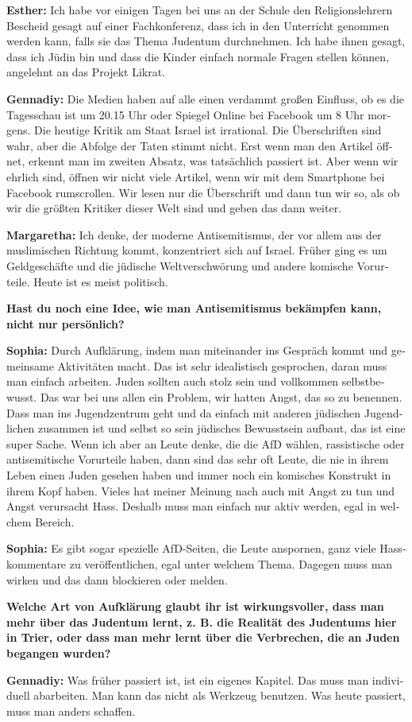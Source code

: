 \begin{otherlanguage}{ngerman}
\textbf{Esther:} Ich habe vor einigen Tagen bei uns an der Schule den Religionslehrern Bescheid gesagt auf einer Fachkonferenz, dass ich in den Unterricht genommen werden kann, falls sie das Thema Judentum durchnehmen. Ich habe ihnen gesagt, dass ich Jüdin bin und dass die Kinder einfach normale Fragen stellen können, angelehnt an das Projekt Likrat. 

\textbf{Gennadiy:} Die Medien haben auf alle einen verdammt großen Einfluss, ob es die Tagesschau ist um 20.15 Uhr oder Spiegel Online bei Facebook um 8 Uhr morgens. Die heutige Kritik am Staat Israel ist irrational. Die Überschriften sind wahr, aber die Abfolge der Taten stimmt nicht. Erst wenn man den Artikel öffnet, erkennt man im zweiten Absatz, was tatsächlich passiert ist. Aber wenn wir ehrlich sind, öffnen wir nicht viele Artikel, wenn wir mit dem Smartphone bei Facebook rumscrollen. Wir lesen nur die Überschrift und dann tun wir so, als ob wir die größten Kritiker dieser Welt sind und geben das dann weiter.  

\textbf{Margaretha:} Ich denke, der moderne Antisemitismus, der vor allem aus der muslimischen Richtung kommt, konzentriert sich auf Israel. Früher ging es um Geldgeschäfte und die jüdische Weltverschwörung und andere komische Vorurteile. Heute ist es meist politisch. 

\textbf{Hast du noch eine Idee, wie man Antisemitismus bekämpfen kann, nicht nur persönlich?} 

\textbf{Sophia:} Durch Aufklärung, indem man miteinander ins Gespräch kommt und gemeinsame Aktivitäten macht. Das ist sehr idealistisch gesprochen, daran muss man einfach arbeiten. Juden sollten auch stolz sein und vollkommen selbstbewusst. Das war bei uns allen ein Problem, wir hatten Angst, das so zu benennen. Dass man ins Jugendzentrum geht und da einfach mit anderen jüdischen Jugendlichen zusammen ist und selbst so sein jüdisches Bewusstsein aufbaut, das ist eine super Sache. Wenn ich aber an Leute denke, die die AfD wählen, rassistische oder antisemitische Vorurteile haben, dann sind das sehr oft Leute, die nie in ihrem Leben einen Juden gesehen haben und immer noch ein komisches Konstrukt in ihrem Kopf haben. Vieles hat meiner Meinung nach auch mit Angst zu tun und Angst verursacht Hass. Deshalb muss man einfach nur aktiv werden, egal in welchem Bereich.     
                                    
\textbf{Sophia:} Es gibt sogar spezielle AfD-Seiten, die Leute anspornen, ganz viele Hasskommentare zu veröffentlichen, egal unter welchem Thema. Dagegen muss man wirken und das dann blockieren oder melden. 

\textbf{Welche Art von Aufklärung glaubt ihr ist wirkungsvoller, dass man mehr über das Judentum lernt, z. B. die Realität des Judentums hier in Trier, oder dass man mehr lernt über die Verbrechen, die an Juden begangen wurden?}\par                                                 
\textbf{Gennadiy:} Was früher passiert ist, ist ein eigenes Kapitel. Das muss man individuell abarbeiten. Man kann das nicht als Werkzeug benutzen. Was heute passiert, muss man anders schaffen. 
\end{otherlanguage}